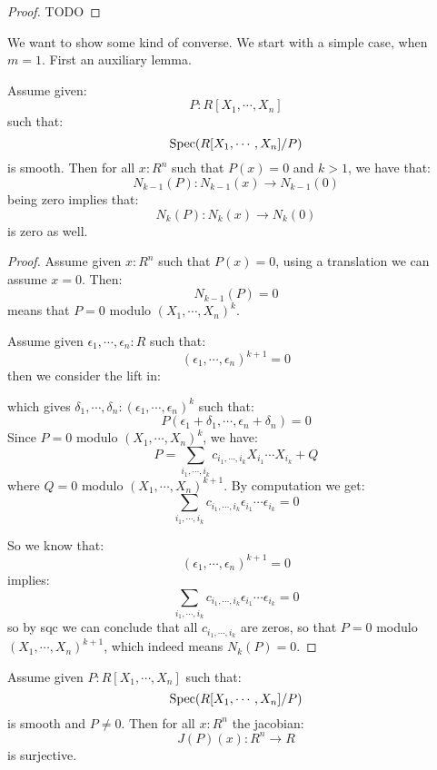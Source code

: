 \begin{proof}
TODO
\end{proof}

We want to show some kind of converse. We start with a simple case, when $m=1$. First an auxiliary lemma.

\begin{lemma}\label{order-smooth-add-one}
Assume given:
\[P : R[X_1,\cdots,X_n]\]
such that:
\[\operatorname{Spec}(R[X_1,\cdots,X_n]/P)\] 
is smooth. Then for all $x:R^n$ such that $P(x)=0$ and $k>1$, we have that:
\[N_{k-1}(P) : N_{k-1}(x) \to N_{k-1}(0)\]
being zero implies that:
\[N_{k}(P) : N_{k}(x) \to N_{k}(0)\]
is zero as well.
\end{lemma}

\begin{proof}
Assume given $x:R^n$ such that $P(x)=0$, using a translation we can assume $x=0$. Then:
\[N_{k-1}(P) = 0\]
means that $P=0$ modulo $(X_1,\cdots,X_n)^k$.

Assume given $\epsilon_1,\cdots,\epsilon_n:R$ such that:
\[(\epsilon_1,\cdots,\epsilon_n)^{k+1}=0\]
then we consider the lift in:
 \begin{center}
    \end{center} 
    which gives $\delta_1,\cdots,\delta_n: (\epsilon_1,\cdots,\epsilon_n)^k$ such that:
    \[P(\epsilon_1+\delta_1,\cdots,\epsilon_n+\delta_n) = 0\]
    Since $P=0$ modulo $(X_1,\cdots,X_n)^k$, we have:
\[P = \sum_{i_1,\cdots,i_k} c_{i_1,\cdots,i_k} X_{i_1}\cdots X_{i_k} + Q\]
where $Q=0$ modulo $(X_1,\cdots,X_n)^{k+1}$. By computation we get:
   \[\sum_{i_1,\cdots,i_k} c_{i_1,\cdots,i_k} \epsilon_{i_1}\cdots \epsilon_{i_k} = 0\]
   
   So we know that:
   \[(\epsilon_1,\cdots,\epsilon_n)^{k+1}=0\]
   implies:
   \[\sum_{i_1,\cdots,i_k} c_{i_1,\cdots,i_k} \epsilon_{i_1}\cdots \epsilon_{i_k} = 0\]
   so by sqc we can conclude that all $c_{i_1,\cdots,i_k}$ are zeros, so that $P = 0$ modulo $(X_1,\cdots,X_n)^{k+1}$, which indeed means $N_k(P)=0$.
\end{proof}

\begin{lemma}
Assume given $P:R[X_1,\cdots,X_n]$ such that:
\[\operatorname{Spec}(R[X_1,\cdots,X_n]/P)\]
is smooth and $P\not=0$. Then for all $x:R^n$ the jacobian:
\[J(P)(x) : R^n \to R\]
is surjective.
\end{lemma}

